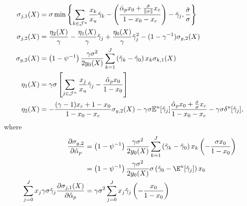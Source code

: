 \begin{align}
\sigma_{j,1}(X) &= \sigma\min\left\{ \sum_{k\in\mathcal{J}^u} \frac{x_k}{x_u} \hat{\gamma}_k -\left(\frac{\hat{\alpha}_p  x_0+\frac{\hat{\sigma}}{\|\sigma\|} x_c }{1-x_0-x_c}\right)- \hat{\gamma}_j  ,\frac{\hat{\sigma}}{\sigma}  \right\}\\
\sigma_{j,2}(X) &= \frac{\eta_2(X)}{\gamma} - \frac{\eta_1(X)}{\gamma}\hat{\gamma}_j + \frac{\eta_0(X)}{\gamma}\hat{\gamma}_j^2 - (1-\gamma^{-1})   \sigma_{y,2}(X)\\
\sigma_{y,2}(X)  &= \left (1-\psi^{-1}\right )\frac{\gamma\sigma^2}{2 y_{0}(X)} \sum_{k=1}^J \left( \hat{\gamma}_k - \hat{\gamma}_0  \right) x_k \sigma_{k,1}(X)\\
\eta_1(X) &= \gamma \sigma \left[\sum_{j\in\mathcal{J}^u} \frac{x_j}{x_u} \hat{\gamma}_j -\frac{\hat{\alpha}_p  x_0}{1-x_0}\right]\\
\eta_2(X) &=  - \frac{(\gamma-1) x_c + 1-x_0}{1-x_0-x_c} \sigma_{y,2}(X) - \gamma \sigma \mathbb{E}^u[\hat{\gamma}_j] \frac{ \hat{\alpha}_p x_0+ \frac{\hat{\sigma}}{\sigma}x_c }{1-x_0-x_c} - \gamma \sigma \var^u[\hat{\gamma}_j],
\end{align}
where
\begin{align}
\frac{\partial \sigma_{y,2}}{\partial \hat{\alpha}_p} &= \left (1-\psi^{-1}\right )\frac{\gamma\sigma^2}{2 y_{0}(X)} \sum_{k=1}^J \left( \hat{\gamma}_k - \hat{\gamma}_0  \right) x_k \left(- \frac{\sigma x_0}{1-x_0} \right)\nonumber\\
&=\left (1-\psi^{-1}\right )\frac{\gamma\sigma^2}{2 y_{0}(X)}\sigma\left(\hat{\gamma}_0-\E^u[\hat{\gamma}_j]\right)x_0\\
\sum_{j=0}^J x_{j}\gamma \sigma \hat{\gamma}_j \frac{\partial \sigma_{j,1}(X)}{\partial \hat{\alpha}_p} &= \gamma \sigma^2 \sum_{j=0}^J x_j \hat{\gamma}_j \left( -\frac{x_0}{1-x_0} \right)
\end{align}


